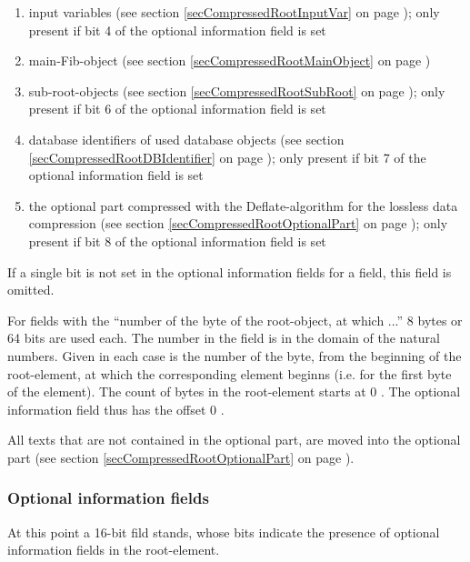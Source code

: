 \begin{enumerate}
 \item input variables (see section \ref{secCompressedRootInputVar} on page \pageref{secCompressedRootInputVar}); only present if bit 4 of the optional information field is set
 \item main-Fib-object (see section \ref{secCompressedRootMainObject} on page \pageref{secCompressedRootMainObject})
 \item sub-root-objects (see section \ref{secCompressedRootSubRoot} on page \pageref{secCompressedRootSubRoot}); only present if bit 6 of the optional information field is set
 \item database identifiers of used database objects (see section \ref{secCompressedRootDBIdentifier} on page \pageref{secCompressedRootDBIdentifier}); only present if bit 7 of the optional information field is set
\item the optional part compressed with the Deflate-algorithm for the lossless data compression (see section \ref{secCompressedRootOptionalPart} on page \pageref{secCompressedRootOptionalPart}); only present if bit 8 of the optional information field is set
\end{enumerate}

If a single bit is not set in the optional information fields for a field, this field is omitted.

For fields with the ``number of the byte of the root-object, at which ...'' 8 bytes or 64 bits are used each. The number in the field is in the domain of the natural numbers. Given in each case is the number of the byte, from the beginning of the root-element, at which the corresponding element beginns (i.e. for the first byte of the element). The count of bytes in the root-element starts at 0 . The optional information field thus has the offset 0 .

All texts that are not contained in the optional part, are moved into the optional part (see section \ref{secCompressedRootOptionalPart} on page \pageref{secCompressedRootOptionalPart}).


\subsubsection{Optional information fields}
\label{secCompressedOptionlInfos}

At this point a 16-bit fild stands, whose bits indicate the presence of optional information fields in the root-element.

